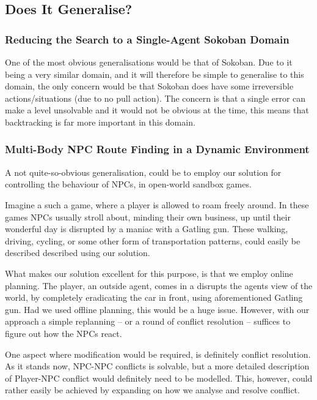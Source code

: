 \documentclass[letterpaper]{article}
\begin{document}
			

	\subsection{Does It Generalise?}


		
		\subsubsection{Reducing the Search to a Single-Agent Sokoban Domain}
			One of the most obvious generalisations would be that of Sokoban. Due to it being a very similar domain, and it will therefore be simple to generalise to this domain, the only concern would be that Sokoban does have some irreversible actions/situations (due to no pull action). The concern is that a single error can make a level unsolvable and it would not be obvious at the time, this means that backtracking is far more important in this domain.

		\subsubsection{Multi-Body NPC Route Finding in a Dynamic Environment}
			A not quite-so-obvious generalisation, could be to employ our solution for controlling the behaviour of NPCs, in open-world sandbox games.

			Imagine a such a game, where a player is allowed to roam freely around. In these games NPCs usually stroll about, minding their own business, up until their wonderful day is disrupted by a maniac with a Gatling gun. These walking, driving, cycling, or some other form of transportation patterns, could easily be described described using our solution. 

			What makes our solution excellent for this purpose, is that we employ online planning. The player, an outside agent, comes in a disrupts the agents view of the world, by completely eradicating the car in front, using aforementioned Gatling gun. Had we used offline planning, this would be a huge issue. However, with our approach a simple replanning -- or a round of conflict resolution -- suffices to figure out how the NPCs react.


			One aspect where modification would be required, is definitely conflict resolution. As it stands now, NPC-NPC conflicts is solvable, but a more detailed description of Player-NPC conflict would definitely need to be modelled. This, however, could rather easily be achieved by expanding on how we analyse and resolve conflict.




\end{document}

